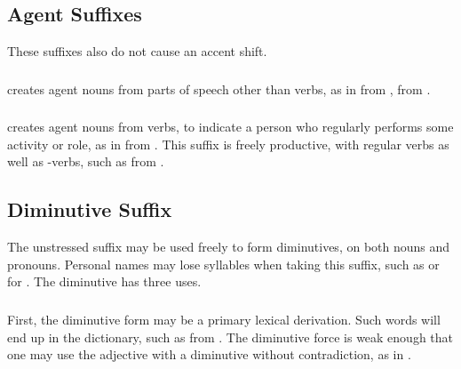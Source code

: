 \subsection{Agent Suffixes} These suffixes also do not cause an accent
shift.

\subsubsection{}  creates agent nouns from parts of speech
other than verbs, as in   from
 ,   from  .

\subsubsection{}  creates agent nouns from verbs, to indicate a
person who regularly performs some activity or role, as in
  from  .  This suffix is freely
productive, with regular verbs as well as -verbs, such
as   from  .


\subsection{Diminutive Suffix} The unstressed suffix  may be
used freely to form diminutives, on both nouns and pronouns.  Personal
names may lose syllables when taking this suffix, such as  or
 for .  The diminutive has three uses.
\label{lingop:dimin}

\subsubsection{} First, the diminutive form may be a primary lexical
derivation.  Such words will end up in the dictionary, such as
  from  .  The
diminutive force is weak enough that one may use the adjective
  with a diminutive without contradiction, as in
 .

